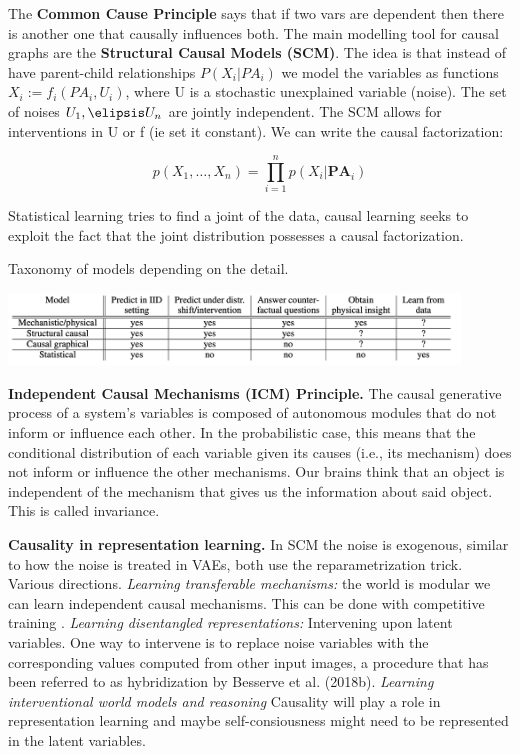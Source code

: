 \documentclass{article}
\begin{document}
The \textbf{Common Cause Principle} says that if two vars are dependent then there is another one that causally influences both. The main modelling tool for causal graphs are the\textbf{ Structural Causal Models (SCM)}. The idea is that instead of have parent-child relationships $P(X_i|PA_i)$ we model the variables as functions $X_i := f_i(PA_i, U_i)$, where U is a stochastic unexplained variable (noise). The set of noises $U_1, \elipsis U_n$ are jointly independent. The SCM allows for interventions in U or f (ie set it constant). We can write the causal factorization: 

\begin{equation}
p\left(X_{1}, \ldots, X_{n}\right)=\prod_{i=1}^{n} p\left(X_{i} | \mathbf{P A}_{i}\right)
\end{equation}

Statistical learning tries to find a joint of the data, causal learning seeks to exploit the fact that the joint distribution possesses a causal factorization. 

Taxonomy of models depending on the detail. 

\includegraphics[width=0.9\textwidth]{images/causal_taxonomy.png}

\textbf{Independent Causal Mechanisms (ICM) Principle.} The causal generative process of a system’s variables is composed of autonomous modules that do not inform or influence each other.
In the probabilistic case, this means that the conditional distribution of each variable given its causes (i.e., its mechanism) does not inform or influence the other mechanisms. Our brains think that an object is independent of the mechanism that gives us the information about said object. This is called invariance. 

\textbf{Causality in representation learning.} In SCM the noise is exogenous, similar to how the noise is treated in VAEs, both use the reparametrization trick. Various directions.\textit{ Learning transferable mechanisms:} the world is modular we can learn independent causal mechanisms. This can be done with competitive training \cite{Goyal2019RecurrentMechanisms}. \textit{Learning disentangled representations:} Intervening upon latent variables. One way to intervene is to replace noise variables with the corresponding values computed from other input images, a procedure that has been referred to as hybridization by Besserve et al. (2018b). \textit{Learning interventional world models and reasoning} Causality will play a role in representation learning and maybe self-consiousness might need to be represented in the latent variables.
\end{document}
